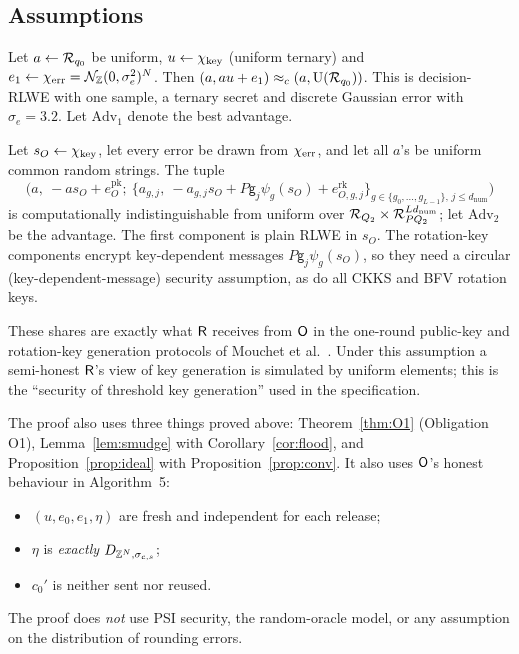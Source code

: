 \subsection{Assumptions}

\begin{assumption}\label{as:rlweu}
Let $a\gets\mathcal{R}_{q_0}$ be uniform, $u\gets\chi_{\mathrm{key}}$ (uniform ternary) and $e_1\gets\chi_{\mathrm{err}}=\mathcal{N}_{\mathbb{Z}}(0,\sigma_e^2)^N$. Then $(a,au+e_1)\approx_c(a,\mathrm{U}(\mathcal{R}_{q_0}))$. This is decision-RLWE with one sample, a ternary secret and discrete Gaussian error with $\sigma_e=3.2$. Let $\mathrm{Adv}_1$ denote the best advantage.
\end{assumption}

\begin{assumption}\label{as:rlweO}
Let $s_O\gets\chi_{\mathrm{key}}$, let every error be drawn from $\chi_{\mathrm{err}}$, and let all $a$'s be uniform common random strings. The tuple
\[
  \bigl(a,\ -as_O+e^{\mathrm{pk}}_O;\ \{a_{g,j},\ -a_{g,j}s_O+P\mathsf g_j\psi_g(s_O)+e^{\mathrm{rk}}_{O,g,j}\}_{g\in\{g_0,\dots,g_{L-1}\},\,j\le d_{\mathrm{num}}}\bigr)
\]
is computationally indistinguishable from uniform over $\mathcal{R}_{Q_2}\times\mathcal{R}_{PQ_2}^{Ld_{\mathrm{num}}}$; let $\mathrm{Adv}_2$ be the advantage. The first component is plain RLWE in $s_O$. The rotation-key components encrypt key-dependent messages $P\mathsf g_j\psi_g(s_O)$, so they need a circular (key-dependent-message) security assumption, as do all CKKS and BFV rotation keys.

These shares are exactly what $\mathsf{R}$ receives from $\mathsf{O}$ in the one-round public-key and rotation-key generation protocols of Mouchet et al.~\cite{MTBH21}. Under this assumption a semi-honest $\mathsf{R}$'s view of key generation is simulated by uniform elements; this is the ``security of threshold key generation'' used in the specification. 
\end{assumption}

The proof also uses three things proved above: Theorem~\ref{thm:O1} (Obligation O1), Lemma~\ref{lem:smudge} with Corollary~\ref{cor:flood}, and Proposition~\ref{prop:ideal} with Proposition~\ref{prop:conv}. It also uses $\mathsf{O}$'s honest behaviour in Algorithm~5:
\begin{itemize}[nosep]
  \item $(u,e_0,e_1,\eta)$ are fresh and independent for each release;
  \item $\eta$ is \emph{exactly} $D_{\mathbb{Z}^N,\sigma_{c,s}}$;
  \item $c_0'$ is neither sent nor reused.
\end{itemize}
The proof does \emph{not} use PSI security, the random-oracle model, or any assumption on the distribution of rounding errors.

